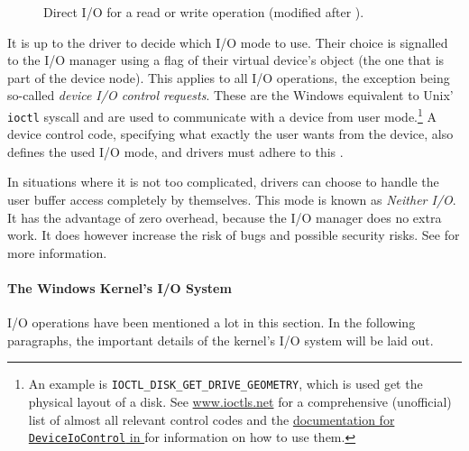 \begin{figure}[htb!]
	\caption[
		Direct I/O for a read or write operation
	]{
		Direct I/O for a read or write operation (modified after \cite{Yosifovich2017}).
	}
	\label{fig:background.kerneldriver.directio}
\end{figure}

It is up to the driver to decide which I/O mode to use. Their choice is signalled to the I/O manager using a flag of their virtual device's object (the one that is part of the device node). This applies to all I/O operations, the exception being so-called \emph{device I/O control requests}. These are the Windows equivalent to Unix' \texttt{ioctl} syscall and are used to communicate with a device from user mode.\footnote{\label{fn:background.kerneldriver.ioctls} An example is \texttt{IOCTL\_DISK\_GET\_DRIVE\_GEOMETRY}, which is used get the physical layout of a disk. See \url{www.ioctls.net} for a comprehensive (unofficial) list of almost all relevant control codes and the \href{https://docs.microsoft.com/en-us/windows/win32/api/ioapiset/nf-ioapiset-deviceiocontrol}{documentation for \texttt{DeviceIoControl} in \cite{Win32}} for information on how to use them.} A device control code, specifying what exactly the user wants from the device, also defines the used I/O mode, and drivers must adhere to this \cite{Yosifovich2017}.

In situations where it is not too complicated, drivers can choose to handle the user buffer access completely by themselves. This mode is known as \emph{Neither I/O}. It has the advantage of zero overhead, because the I/O manager does no extra work. It does however increase the risk of bugs and possible security risks. See \cite{Yosifovich2017} for more information.

\paragraph{The Windows Kernel's I/O System}
I/O operations have been mentioned a lot in this section. In the following paragraphs, the important details of the kernel's I/O system will be laid out.

